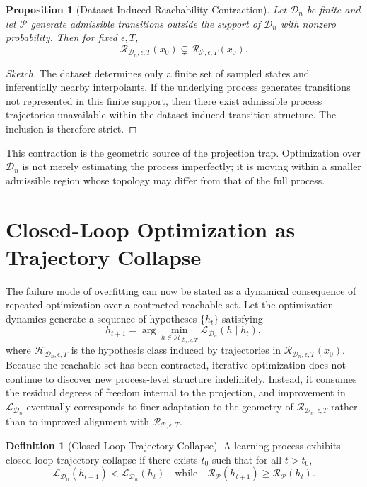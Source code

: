 \documentclass[12pt]{article}
\theoremstyle{plain}
\newtheorem{proposition}[theorem]{Proposition}
\theoremstyle{definition}
\newtheorem{definition}[theorem]{Definition}
\theoremstyle{remark}
\begin{document}
\begin{proposition}[Dataset-Induced Reachability Contraction]
Let $\mathcal{D}_n$ be finite and let $\mathcal{P}$ generate admissible transitions outside the support of $\mathcal{D}_n$ with nonzero probability. Then for fixed $\epsilon, T$,
\[
\mathcal{R}_{\mathcal{D}_n,\epsilon,T}(x_0) \subsetneq \mathcal{R}_{\mathcal{P},\epsilon,T}(x_0).
\]
\end{proposition}

\begin{proof}[Sketch]
The dataset determines only a finite set of sampled states and inferentially nearby interpolants. If the underlying process generates transitions not represented in this finite support, then there exist admissible process trajectories unavailable within the dataset-induced transition structure. The inclusion is therefore strict.
\end{proof}

This contraction is the geometric source of the projection trap. Optimization over $\mathcal{D}_n$ is not merely estimating the process imperfectly; it is moving within a smaller admissible region whose topology may differ from that of the full process.

\section{Closed-Loop Optimization as Trajectory Collapse}

The failure mode of overfitting can now be stated as a dynamical consequence of repeated optimization over a contracted reachable set. Let the optimization dynamics generate a sequence of hypotheses $\{h_t\}$ satisfying
\[
h_{t+1} = \arg\min_{h \in \mathcal{H}_{\mathcal{D}_n,\epsilon,T}} \mathcal{L}_{\mathcal{D}_n}(h \mid h_t),
\]
where $\mathcal{H}_{\mathcal{D}_n,\epsilon,T}$ is the hypothesis class induced by trajectories in $\mathcal{R}_{\mathcal{D}_n,\epsilon,T}(x_0)$. Because the reachable set has been contracted, iterative optimization does not continue to discover new process-level structure indefinitely. Instead, it consumes the residual degrees of freedom internal to the projection, and improvement in $\mathcal{L}_{\mathcal{D}_n}$ eventually corresponds to finer adaptation to the geometry of $\mathcal{R}_{\mathcal{D}_n,\epsilon,T}$ rather than to improved alignment with $\mathcal{R}_{\mathcal{P},\epsilon,T}$.

\begin{definition}[Closed-Loop Trajectory Collapse]
A learning process exhibits closed-loop trajectory collapse if there exists $t_0$ such that for all $t > t_0$,
\[
\mathcal{L}_{\mathcal{D}_n}(h_{t+1}) < \mathcal{L}_{\mathcal{D}_n}(h_t) \quad \text{while} \quad \mathcal{R}_{\mathcal{P}}(h_{t+1}) \ge \mathcal{R}_{\mathcal{P}}(h_t).
\]
\end{definition}
\end{document}
